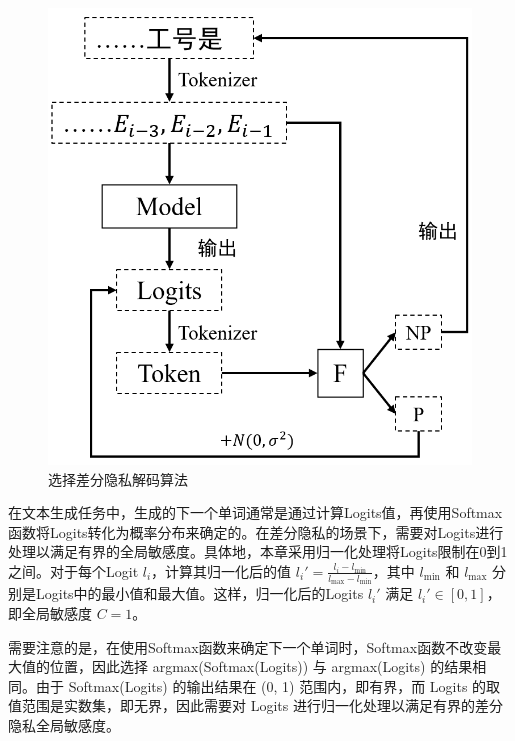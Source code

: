 \begin{figure}[h]
	\centering
	\includegraphics[width=0.44\linewidth]{figures/Chap5_PDP_Decode.png}
	\caption{选择差分隐私解码算法}
	\label{Chap5_PDP_Decode}
\end{figure}


在文本生成任务中，生成的下一个单词通常是通过计算Logits值，再使用Softmax函数将Logits转化为概率分布来确定的。在差分隐私的场景下，需要对Logits进行处理以满足有界的全局敏感度。具体地，本章采用归一化处理将Logits限制在0到1之间。对于每个Logit $l_i$，计算其归一化后的值 $l_i' = \frac{l_i - l_{\text{min}}}{l_{\text{max}} - l_{\text{min}}}$，其中 $l_{\text{min}}$ 和 $l_{\text{max}}$ 分别是Logits中的最小值和最大值。这样，归一化后的Logits $l_i'$ 满足 $l_i' \in [0, 1]$，即全局敏感度 $C=1$。

需要注意的是，在使用Softmax函数来确定下一个单词时，Softmax函数不改变最大值的位置，因此选择 argmax(Softmax(Logits)) 与 argmax(Logits) 的结果相同。由于 Softmax(Logits) 的输出结果在 (0, 1) 范围内，即有界，而 Logits 的取值范围是实数集，即无界，因此需要对 Logits 进行归一化处理以满足有界的差分隐私全局敏感度。



